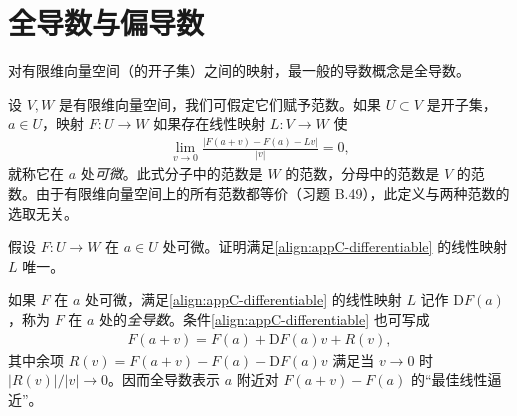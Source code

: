 \documentclass[../../main.tex]{subfiles}
\begin{document}
\section{全导数与偏导数}\label{section:appC-total-and-partial-derivatives}

对有限维向量空间（的开子集）之间的映射，最一般的导数概念是全导数。

设 $V,W$ 是有限维向量空间，我们可假定它们赋予范数。如果 $U\subset V$ 是开子集，$a\in U$，映射 $F:U\to W$ 如果存在线性映射 $L:V\to W$ 使
\begin{align}\label{align:appC-differentiable}
\lim_{v\to0}\frac{|F(a+v)-F(a)-Lv|}{|v|}=0,
\end{align}
就称它在 $a$ 处\emph{可微}。此式分子中的范数是 $W$ 的范数，分母中的范数是 $V$ 的范数。由于有限维向量空间上的所有范数都等价（习题 B.49），此定义与两种范数的选取无关。

\begin{exercise}\label{exercise:appC-C-1}
假设 $F:U\to W$ 在 $a\in U$ 处可微。证明满足\eqref{align:appC-differentiable} 的线性映射 $L$ 唯一。
\end{exercise}

如果 $F$ 在 $a$ 处可微，满足\eqref{align:appC-differentiable} 的线性映射 $L$ 记作 $\mathrm{D}F(a)$，称为 $F$ 在 $a$ 处的\emph{全导数}。条件\eqref{align:appC-differentiable} 也可写成
\begin{align}\label{align:appC-remainder}
F(a+v)=F(a)+\mathrm{D}F(a)v+R(v),
\end{align}
其中余项 $R(v)=F(a+v)-F(a)-\mathrm{D}F(a)v$ 满足当 $v\to0$ 时 $|R(v)|/|v|\to0$。因而全导数表示 $a$ 附近对 $F(a+v)-F(a)$ 的“最佳线性逼近”。
\end{document}
